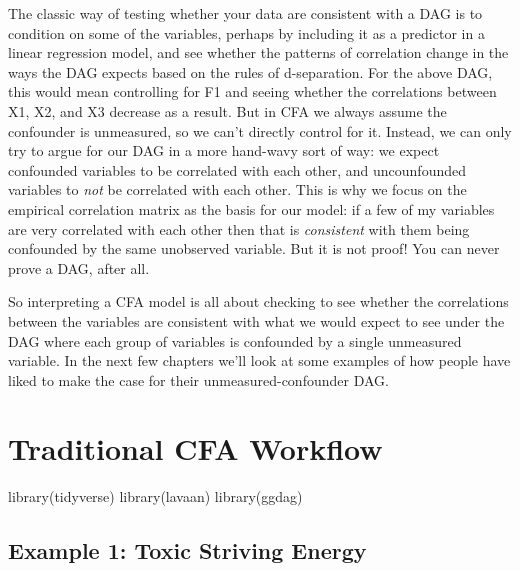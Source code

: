 \documentclass[
  letterpaper,
  DIV=11,
  numbers=noendperiod]{scrreprt}
\newenvironment{Shaded}{\begin{snugshade}}{\end{snugshade}}
\newcommand{\FunctionTok}[1]{\textcolor[rgb]{0.28,0.35,0.67}{#1}}
\newcommand{\NormalTok}[1]{\textcolor[rgb]{0.00,0.23,0.31}{#1}}
\begin{document}
The classic way of testing whether your data are consistent with a DAG
is to condition on some of the variables, perhaps by including it as a
predictor in a linear regression model, and see whether the patterns of
correlation change in the ways the DAG expects based on the rules of
d-separation. For the above DAG, this would mean controlling for F1 and
seeing whether the correlations between X1, X2, and X3 decrease as a
result. But in CFA we always assume the confounder is unmeasured, so we
can't directly control for it. Instead, we can only try to argue for our
DAG in a more hand-wavy sort of way: we expect confounded variables to
be correlated with each other, and uncounfounded variables to \emph{not}
be correlated with each other. This is why we focus on the empirical
correlation matrix as the basis for our model: if a few of my variables
are very correlated with each other then that is \emph{consistent} with
them being confounded by the same unobserved variable. But it is not
proof! You can never prove a DAG, after all.

So interpreting a CFA model is all about checking to see whether the
correlations between the variables are consistent with what we would
expect to see under the DAG where each group of variables is confounded
by a single unmeasured variable. In the next few chapters we'll look at
some examples of how people have liked to make the case for their
unmeasured-confounder DAG.

\hypertarget{traditional-cfa-workflow}{%
\chapter{Traditional CFA Workflow}\label{traditional-cfa-workflow}}

\begin{Shaded}
\begin{Highlighting}[]
\FunctionTok{library}\NormalTok{(tidyverse)}
\FunctionTok{library}\NormalTok{(lavaan)}
\FunctionTok{library}\NormalTok{(ggdag)}
\end{Highlighting}
\end{Shaded}

\hypertarget{example-1-toxic-striving-energy}{%
\section*{Example 1: Toxic Striving
Energy}\label{example-1-toxic-striving-energy}}
\end{document}
